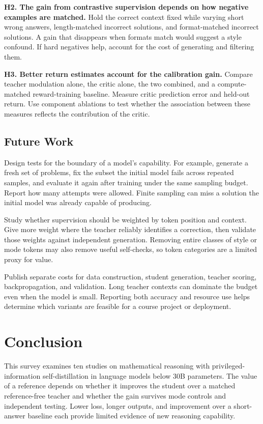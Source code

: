 \documentclass[11pt,a4paper]{article}
\begin{document}
\textbf{H2. The gain from contrastive supervision depends on how negative examples are matched.} Hold the correct context fixed while varying short wrong answers, length-matched incorrect solutions, and format-matched incorrect solutions. A gain that disappears when formats match would suggest a style confound. If hard negatives help, account for the cost of generating and filtering them.

\textbf{H3. Better return estimates account for the calibration gain.} Compare teacher modulation alone, the critic alone, the two combined, and a compute-matched reward-training baseline. Measure critic prediction error and held-out return. Use component ablations to test whether the association between these measures reflects the contribution of the critic.

\subsection{Future Work}
Design tests for the boundary of a model's capability. For example, generate a fresh set of problems, fix the subset the initial model fails across repeated samples, and evaluate it again after training under the same sampling budget. Report how many attempts were allowed. Finite sampling can miss a solution the initial model was already capable of producing.

Study whether supervision should be weighted by token position and context. Give more weight where the teacher reliably identifies a correction, then validate those weights against independent generation. Removing entire classes of style or mode tokens may also remove useful self-checks, so token categories are a limited proxy for value.

Publish separate costs for data construction, student generation, teacher scoring, backpropagation, and validation. Long teacher contexts can dominate the budget even when the model is small. Reporting both accuracy and resource use helps determine which variants are feasible for a course project or deployment.

\section{Conclusion}
This survey examines ten studies on mathematical reasoning with privileged-information self-distillation in language models below 30B parameters. The value of a reference depends on whether it improves the student over a matched reference-free teacher and whether the gain survives mode controls and independent testing. Lower loss, longer outputs, and improvement over a short-answer baseline each provide limited evidence of new reasoning capability.
\end{document}
